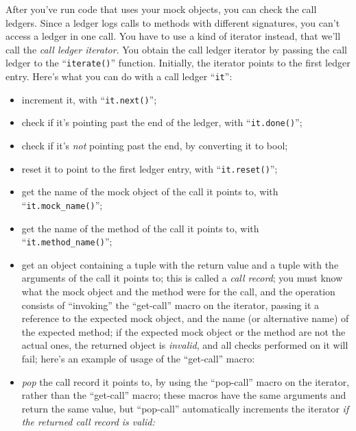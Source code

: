 \documentclass[twoside, a4paper, article]{memoir}
\newcommand\typesetexample[1]{%
  \typesetexamplesource{#1}
}
\providecommand\typesetexamplesource[1]{%
}
\begin{document}
After you've run code that uses your mock objects, you can check the call
ledgers.  Since a ledger logs calls to methods with different signatures, you
can't access a ledger in one call.  You have to use a kind of iterator instead,
that we'll call the \emph{call ledger iterator}.  You obtain the call ledger
iterator by passing the call ledger to the ``\texttt{iterate()}'' function.
Initially, the iterator points to the first ledger entry.  Here's what you can
do with a call ledger ``\texttt{it}'':
\begin{itemize}
\item increment it, with ``\texttt{it.next()}'';
\item check if it's pointing past the end of the ledger, with
  ``\texttt{it.done()}'';
\item check if it's \emph{not} pointing past the end, by converting it to bool;
\item reset it to point to the first ledger entry, with
  ``\texttt{it.reset()}'';
\item get the name of the mock object of the call it points to, with
  ``\texttt{it.mock\_name()}'';
\item get the name of the method of the call it points to, with
  ``\texttt{it.method\_name()}'';
\item get an object containing a tuple with the return value and a tuple with
  the arguments of the call it points to; this is called a \emph{call record};
  you must know what the mock object and the method were for the call, and the
  operation consists of ``invoking'' the ``get-call'' macro on the iterator,
  passing it a reference to the expected mock object, and the name (or
  alternative name) of the expected method; if the expected mock object or the
  method are not the actual ones, the returned object is \emph{invalid}, and
  all checks performed on it will fail; here's an example of usage of the
  ``get-call'' macro:

  \typesetexample{ledger-iterator-get-call}

\item \emph{pop} the call record it points to, by using the ``pop-call'' macro
  on the iterator, rather than the ``get-call'' macro; these macros have the
  same arguments and return the same value, but ``pop-call'' automatically
  increments the iterator \emph{if the returned call record is valid:}

  \typesetexample{ledger-iterator-pop-call}
\end{itemize}
\end{document}
